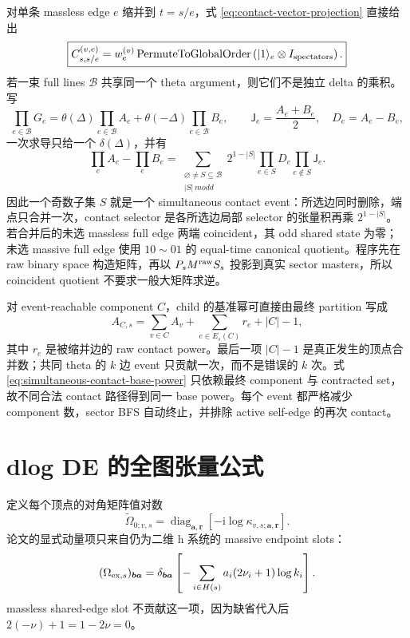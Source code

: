 \documentclass[11pt,a4paper]{ctexart}
\newcommand{\ii}{\mathrm i}
\begin{document}
对单条 massless edge $e$ 缩并到 $t=s/e$，式 \eqref{eq:contact-vector-projection} 直接给出
\begin{equation}
 \boxed{
 C_{s,s/e}^{(v,e)}
 =w_e^{(v)}
 \operatorname{PermuteToGlobalOrder}
 \left(|1\rangle_e\otimes I_{\rm spectators}\right).
 }
 \label{eq:contact-injection}
\end{equation}
若一束 full lines $\mathcal B$ 共享同一个 theta argument，则它们不是独立 delta 的乘积。写
\begin{equation}
 \prod_{e\in\mathcal B}G_e
 =\theta(\Delta)\prod_{e\in\mathcal B}A_e
 +\theta(-\Delta)\prod_{e\in\mathcal B}B_e,
 \qquad
 \mathsf J_e=\frac{A_e+B_e}{2},\quad D_e=A_e-B_e,
\end{equation}
一次求导只给一个 $\delta(\Delta)$，并有
\begin{equation}
 \prod_eA_e-\prod_eB_e
 =\sum_{\substack{\varnothing\neq S\subseteq\mathcal B\\|S|\ {
m odd}}}
 2^{1-|S|}\prod_{e\in S}D_e\prod_{e\notin S}\mathsf J_e.
 \label{eq:common-theta-odd-subsets}
\end{equation}
因此一个奇数子集 $S$ 就是一个 simultaneous contact event：所选边同时删除，端点只合并一次，contact selector 是各所选边局部 selector 的张量积再乘 $2^{1-|S|}$。若合并后的未选 massless full edge 两端 coincident，其 odd shared state 为零；未选 massive full edge 使用 $10\sim01$ 的 equal-time canonical quotient。程序先在 raw binary space 构造矩阵，再以 $P_sM^{\rm raw}S_s$ 投影到真实 sector masters，所以 coincident quotient 不要求一般大矩阵求逆。

对 event-reachable component $C$，child 的基准幂可直接由最终 partition 写成
\begin{equation}
 A_{C,s}=\sum_{v\in C}A_v
 +\sum_{e\in E_s(C)}r_e+|C|-1,
 \label{eq:simultaneous-contact-base-power}
\end{equation}
其中 $r_e$ 是被缩并边的 raw contact power。最后一项 $|C|-1$ 是真正发生的顶点合并数；共同 theta 的 $k$ 边 event 只贡献一次，而不是错误的 $k$ 次。式 \eqref{eq:simultaneous-contact-base-power} 只依赖最终 component 与 contracted set，故不同合法 contact 路径得到同一 base power。每个 event 都严格减少 component 数，sector BFS 自动终止，并排除 active self-edge 的再次 contact。

\section{dlog DE 的全图张量公式}

定义每个顶点的对角矩阵值对数
\begin{equation}
 \widetilde\Omega_{0;v,s}
 =\operatorname{diag}_{\bm a,\bm r}
 \left[-\ii\log\kappa_{v,s;\bm a,\bm r}\right].
 \label{eq:global-omega0}
\end{equation}
论文的显式动量项只来自仍为二维 h 系统的 massive endpoint slots：
\begin{equation}
 (\Omega_{{\rm ex},s})_{\bm b\bm a}
 =\delta_{\bm b\bm a}
 \left[-\sum_{i\in H(s)}a_i(2\nu_i+1)\log k_i\right].
 \label{eq:global-omega-ex}
\end{equation}
massless shared-edge slot 不贡献这一项，因为缺省代入后 $2(-\nu)+1=1-2\nu=0$。
\end{document}
